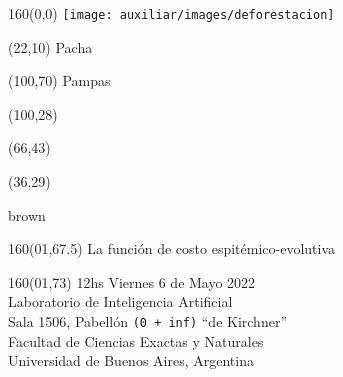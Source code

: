 \documentclass[shownotes,aspectratio=169]{beamer}
\begin{document}
\color{black!85}
\large

 

\begin{frame}


\begin{textblock}{160}(0,0)
\texttt{[image: auxiliar/images/deforestacion]}
\end{textblock}

\begin{textblock}{80}(22,10)
\textcolor{black!15}{\fontsize{44}{55}\selectfont Pacha}
\end{textblock}

\begin{textblock}{47}(100,70)
\centering \textcolor{black!15}{{\fontsize{52}{65}\selectfont Pampas}}
\end{textblock}

\begin{textblock}{80}(100,28)
\LARGE  \textcolor{black!15}{}
\end{textblock}


\begin{textblock}{80}(66,43)
\LARGE  \textcolor{black!15}{\scalebox{6}{$=$}}
\end{textblock}

\begin{textblock}{80}(36,29)
\LARGE  \textcolor{black!15}{\scalebox{9}{$p$}}
\end{textblock}

 \vspace{2cm}brown
\maketitle



\begin{textblock}{160}(01,67.5)
\normalsize \textcolor{black!5}{La función de costo espitémico-evolutiva}
\end{textblock} 

\begin{textblock}{160}(01,73)
\scriptsize \textcolor{black!5}{12hs Viernes 6 de Mayo 2022 \\
Laboratorio de Inteligencia Artificial \\ 
Sala 1506, Pabellón \texttt{(0 + inf)} ``de Kirchner'' \\
Facultad de Ciencias Exactas y Naturales \\ 
Universidad de Buenos Aires, Argentina}
\end{textblock} 

\end{frame}
\end{document}
